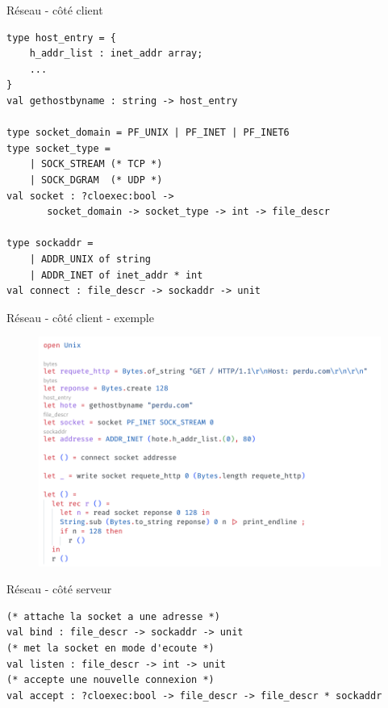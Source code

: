 
\begin{frame}[fragile]{Réseau - côté client}

\begin{lstlisting}
type host_entry = {
	h_addr_list : inet_addr array;
    ...
}
val gethostbyname : string -> host_entry

type socket_domain = PF_UNIX | PF_INET | PF_INET6
type socket_type =
    | SOCK_STREAM (* TCP *)
    | SOCK_DGRAM  (* UDP *)
val socket : ?cloexec:bool ->
       socket_domain -> socket_type -> int -> file_descr

type sockaddr =
    | ADDR_UNIX of string
    | ADDR_INET of inet_addr * int
val connect : file_descr -> sockaddr -> unit
\end{lstlisting}

\end{frame}

\begin{frame}[fragile]{Réseau - côté client - exemple}

\begin{figure}
    \centering
    \includegraphics[width=\textwidth]{slides/images/unixsocket.png}
\end{figure}

\end{frame}

\begin{frame}[fragile]{Réseau - côté serveur}

\begin{lstlisting}
(* attache la socket a une adresse *)
val bind : file_descr -> sockaddr -> unit
(* met la socket en mode d'ecoute *)
val listen : file_descr -> int -> unit
(* accepte une nouvelle connexion *)
val accept : ?cloexec:bool -> file_descr -> file_descr * sockaddr
\end{lstlisting}

\end{frame}


